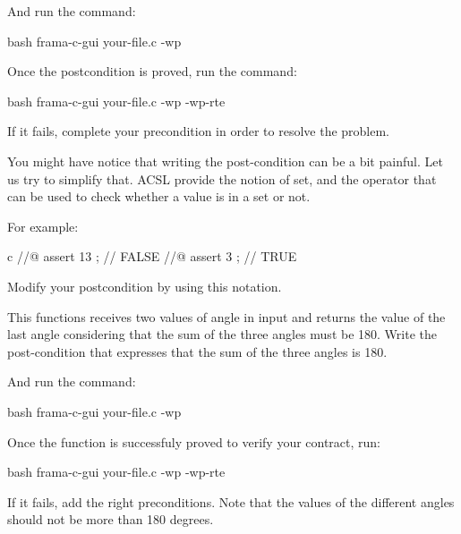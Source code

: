 

And run the command:


\begin{CodeBlock}{bash}
frama-c-gui your-file.c -wp
\end{CodeBlock}


Once the postcondition is proved, run the command:



\begin{CodeBlock}{bash}
frama-c-gui your-file.c -wp -wp-rte
\end{CodeBlock}



If it fails, complete your precondition in order to resolve the problem.



You might have notice that writing the post-condition can be a bit painful.
Let us try to simplify that. ACSL provide the notion of set, and the operator
 that can be used to check whether a value is
in a set or not.


For example:


\begin{CodeBlock}{c}
//@ assert 13  ; // FALSE
//@ assert 3   ; // TRUE
\end{CodeBlock}



Modify your postcondition by using this notation.






This functions receives two values of angle in input and returns the value
of the last angle considering that the sum of the three angles must be 180.
Write the post-condition that expresses that the sum of the three angles is
180.





And run the command:


\begin{CodeBlock}{bash}
frama-c-gui your-file.c -wp
\end{CodeBlock}


Once the function is successfuly proved to verify your contract, run:


\begin{CodeBlock}{bash}
frama-c-gui your-file.c -wp -wp-rte
\end{CodeBlock}



If it fails, add the right preconditions. Note that the values of the different
angles should not be more than 180 degrees.
